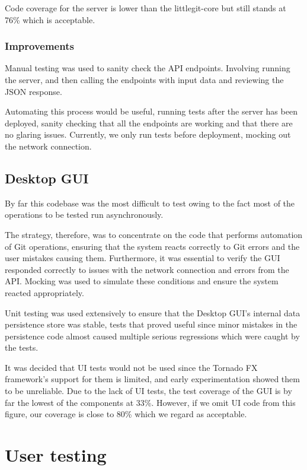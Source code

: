 Code coverage for the server is lower than the littlegit-core but still stands at 76\% which is acceptable.

\subsubsection{Improvements}

Manual testing was used to sanity check the API endpoints. Involving running the server, and then calling the endpoints with input data and reviewing the JSON response. 

Automating this process would be useful, running tests after the server has been deployed, sanity checking that all the endpoints are working and that there are no glaring issues. Currently, we only run tests before deployment, mocking out the network connection.
 
\subsection{Desktop GUI}

By far this codebase was the most difficult to test owing to the fact most of the operations to be tested run asynchronously. 

The strategy, therefore, was to concentrate on the code that performs automation of Git operations, ensuring that the system reacts correctly to Git errors and the user mistakes causing them. Furthermore, it was essential to verify the GUI responded correctly to issues with the network connection and errors from the API. Mocking was used to simulate these conditions and ensure the system reacted appropriately.

Unit testing was used extensively to ensure that the Desktop GUI's internal data persistence store was stable, tests that proved useful since minor mistakes in the persistence code almost caused multiple serious regressions which were caught by the tests.

It was decided that UI tests would not be used since the Tornado FX framework's support for them is limited, and early experimentation showed them to be unreliable. Due to the lack of UI tests, the test coverage of the GUI is by far the lowest of the components at 33\%. However, if we omit UI code from this figure, our coverage is close to 80\% which we regard as acceptable.

\section{User testing}\label{sec:user-testing}

